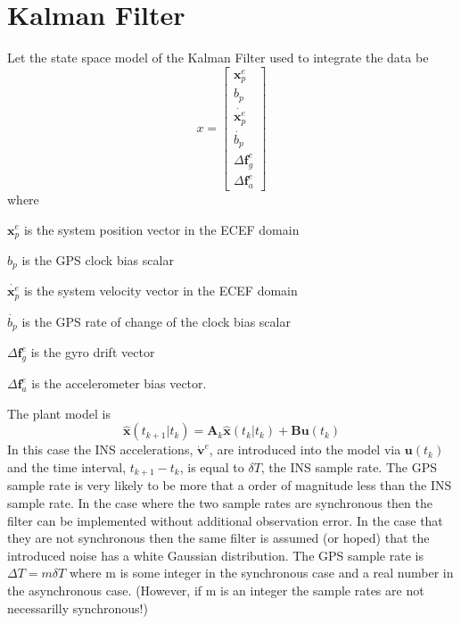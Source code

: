 \documentclass[a4paper]{report}
\numberwithin{equation}{chapter}
\newcommand{\mat}[1]{\boldsymbol{#1}}
\begin{document}
\section[Kalman Filter]{Kalman Filter}

Let the state space model of the Kalman Filter used to integrate the data be
\begin{equation}
x =
\begin{bmatrix}
\mat{x}^e_p\\
b_p\\
\dot{\mat{x}^e_p}\\
\dot{b_p}\\
\Delta \mat{f}^e_g\\
\Delta \mat{f}^e_a
\end{bmatrix}
\label{StateSpaceModel}
\end{equation}
where

$\mat{x}^e_p$ is the system position vector in the ECEF domain

$b_p$ is the GPS clock bias scalar

$\dot{\mat{x}^e_p}$ is the system velocity vector in the ECEF domain

$\dot{b_p}$ is the GPS rate of change of the clock bias scalar

$\Delta \mat{f}^e_g$ is the gyro drift vector

$\Delta \mat{f}^e_a$ is the accelerometer bias vector.

\bigskip

The plant model is
\begin{equation}
\hat{\mat{x}} \left( t_{k + 1} | t_k \right) = \mat{A}_k \hat{\mat{x}} \left( t_k | t_k \right) + \mat{B} \mat{u} \left( t_k \right)
\label{eqn:PlantModel}
\end{equation}
In this case the INS accelerations, $\dot{\mat{v}}^e$, are introduced into the model via $\mat{u} \left( t_k \right)$ and the time interval, $t_{k + 1} - t_k$, is equal to $\delta T$, the INS sample rate. The GPS sample rate is very likely to be more that a order of magnitude less than the INS sample rate. In the case where the two sample rates are synchronous then the filter can be implemented without additional observation error. In the case that they are not synchronous then the same filter is assumed (or hoped) that the introduced noise has a white Gaussian distribution. The GPS sample rate is $\Delta T = m \delta T$ where m is some integer in the synchronous case and a real number in the asynchronous case. (However, if m is an integer the sample rates are not necessarilly synchronous!)
\end{document}
